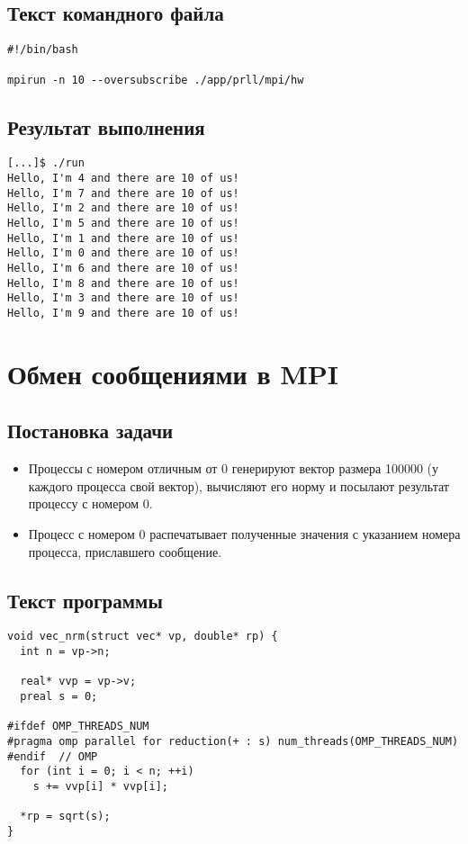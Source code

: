 \documentclass[12pt, a4paper]{article}
\begin{document}
\subsection{Текст командного файла}

\begin{verbatim}
#!/bin/bash

mpirun -n 10 --oversubscribe ./app/prll/mpi/hw
\end{verbatim}

\subsection{Результат выполнения}

\begin{verbatim}
[...]$ ./run
Hello, I'm 4 and there are 10 of us!
Hello, I'm 7 and there are 10 of us!
Hello, I'm 2 and there are 10 of us!
Hello, I'm 5 and there are 10 of us!
Hello, I'm 1 and there are 10 of us!
Hello, I'm 0 and there are 10 of us!
Hello, I'm 6 and there are 10 of us!
Hello, I'm 8 and there are 10 of us!
Hello, I'm 3 and there are 10 of us!
Hello, I'm 9 and there are 10 of us!
\end{verbatim}

\newpage

\section{Обмен сообщениями в MPI}
\subsection{Постановка задачи}

\begin{itemize}
  \item Процессы с номером отличным от 0 генерируют вектор размера 100000 (у каждого процесса свой вектор), вычисляют его норму и посылают результат процессу с номером 0.
  \item Процесс с номером 0 распечатывает полученные значения с указанием номера процесса, приславшего сообщение.
\end{itemize}

\subsection{Текст программы}

\begin{verbatim}
void vec_nrm(struct vec* vp, double* rp) {
  int n = vp->n;

  real* vvp = vp->v;
  preal s = 0;

#ifdef OMP_THREADS_NUM
#pragma omp parallel for reduction(+ : s) num_threads(OMP_THREADS_NUM)
#endif  // OMP
  for (int i = 0; i < n; ++i)
    s += vvp[i] * vvp[i];

  *rp = sqrt(s);
}
\end{verbatim}
\end{document}
